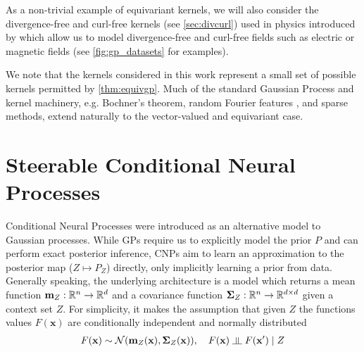 As a non-trivial example of equivariant kernels, we will also consider the divergence-free and curl-free kernels (see \cref{sec:divcurl}) used in physics introduced by \textcite{macedo2010learning} which allow us to model divergence-free and curl-free fields such as electric or magnetic fields (see \cref{fig:gp_datasets} for examples).

We note that the kernels considered in this work represent a small set of possible kernels permitted by \cref{thm:equivgp}.
Much of the standard Gaussian Process and kernel machinery, e.g. Bochner's theorem, random Fourier features \parencite{brault_random_2016}, and sparse methods, extend naturally to the vector-valued and equivariant case.

\section{Steerable Conditional Neural Processes}
\label{sec:equiv_CNPs}

Conditional Neural Processes were introduced as an alternative model to Gaussian processes.
While GPs require us to explicitly model the prior $P$ and can perform exact posterior inference, CNPs aim to learn an approximation to the posterior map ($Z\mapsto P_Z$) directly, only implicitly learning a prior from data.
Generally speaking, the underlying architecture is a model which returns a mean function $\mathbf{m}_{Z}:\mathbb{R}^n\to\mathbb{R}^d$ and a covariance function $\mathbf{\Sigma}_{Z}:\mathbb{R}^n\to\mathbb{R}^{d\times d}$ given a context set $Z$.
For simplicity, it makes the assumption that given $Z$ the functions values $F(\mathbf{x})$ are conditionally independent and normally distributed \begin{align} \label{eq:CNP_model} F(\mathbf{x})\sim\mathcal{N}(\mathbf{m}_{Z}(\mathbf{x}),\mathbf{\Sigma}_{Z}(\mathbf{x})),\quad F(\mathbf{x})\indep F(\mathbf{x}') \; | \; Z \end{align} 


